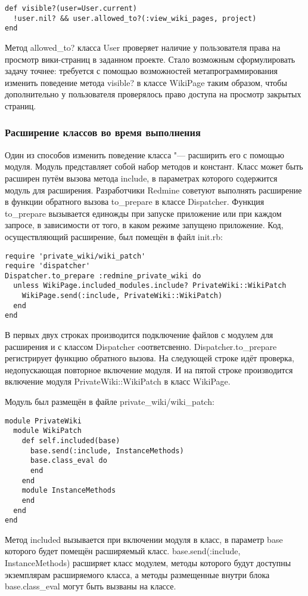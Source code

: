 \small{
\begin{lstlisting}
def visible?(user=User.current)
  !user.nil? && user.allowed_to?(:view_wiki_pages, project)
end
\end{lstlisting}}
Метод allowed\_to? класса User проверяет наличие у пользователя права на
просмотр вики-страниц в заданном проекте. Стало возможным сформулировать
задачу точнее: требуется с помощью возможностей метапрограммирования изменить
поведение метода visible? в классе WikiPage таким образом, чтобы дополнительно
у пользователя проверялось право доступа на просмотр закрытых страниц.

\subsubsection{Расширение классов во время выполнения} 
Один из способов изменить поведение класса "--- расширить его с помощью модуля.
Модуль представляет собой набор методов и констант.
Класс может быть расширен путём вызова метода include, в параметрах которого
содержится модуль для расширения. Разработчики Redmine советуют выполнять
расширение в функции обратного вызова to\_prepare в классе Dispatcher. Функция
to\_prepare вызывается единожды при запуске приложение или при каждом запросе,
в зависимости от того, в каком режиме запущено приложение. Код, осуществляющий
расширение, был помещён в файл init.rb:

\small{
\begin{lstlisting}
require 'private_wiki/wiki_patch'
require 'dispatcher'
Dispatcher.to_prepare :redmine_private_wiki do
  unless WikiPage.included_modules.include? PrivateWiki::WikiPatch
    WikiPage.send(:include, PrivateWiki::WikiPatch)
  end 
end
\end{lstlisting}}
В первых двух строках производится подключение файлов с модулем для расширения
и с классом Dispatcher cоответсвенно. Dispatcher.to\_prepare регистрирует
функцию обратного вызова. На следующей строке идёт проверка, недопускающая
повторное включение модуля. И на пятой строке производится включение модуля
PrivateWiki::WikiPatch в класс WikiPage.

Модуль был размещён в файле private\_wiki/wiki\_patch:
\small{
\begin{lstlisting}
module PrivateWiki
  module WikiPatch
    def self.included(base)
      base.send(:include, InstanceMethods)
      base.class_eval do
      end
    end
    module InstanceMethods
    end
  end
end
\end{lstlisting}}
Метод included вызывается при включении модуля в класс, в параметр base
которого будет помещён расширяемый класс. base.send(:include, InstanceMethods)
расширяет класс модулем, методы которого будут доступны экземплярам
расширяемого класса, а методы размещенные внутри блока base.class\_eval могут
быть вызваны на классе.


